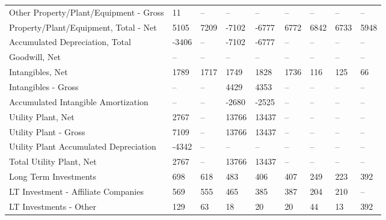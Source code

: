 \documentclass[grad,numbers]{coppe}
\begin{document}
\begin{longtable}[t]{lllllllll}
  \hspace{1em}\hspace{1em}Other Property/Plant/Equipment - Gross & 11 & -- & -- & -- & -- & -- & -- & --\\
  \hspace{1em}Property/Plant/Equipment, Total - Net & 5105 & 7209 & -7102 & -6777 & 6772 & 6842 & 6733 & 5948\\
  \hspace{1em}\hspace{1em}Accumulated Depreciation, Total & -3406 & -- & -7102 & -6777 & -- & -- & -- & --\\
  \hspace{1em}Goodwill, Net & -- & -- & -- & -- & -- & -- & -- & --\\
  \hspace{1em}Intangibles, Net & 1789 & 1717 & 1749 & 1828 & 1736 & 116 & 125 & 66\\
  \hspace{1em}\hspace{1em}Intangibles - Gross & -- & -- & 4429 & 4353 & -- & -- & -- & --\\
  \hspace{1em}\hspace{1em}Accumulated Intangible Amortization & -- & -- & -2680 & -2525 & -- & -- & -- & --\\
  \hspace{1em}Utility Plant, Net & 2767 & -- & 13766 & 13437 & -- & -- & -- & --\\
  \hspace{1em}\hspace{1em}Utility Plant - Gross & 7109 & -- & 13766 & 13437 & -- & -- & -- & --\\
  \hspace{1em}\hspace{1em}Utility Plant Accumulated Depreciation & -4342 & -- & -- & -- & -- & -- & -- & --\\
  \hspace{1em}Total Utility Plant, Net & 2767 & -- & 13766 & 13437 & -- & -- & -- & --\\
  \hspace{1em}Long Term Investments & 698 & 618 & 483 & 406 & 407 & 249 & 223 & 392\\
  \hspace{1em}\hspace{1em}LT Investment - Affiliate Companies & 569 & 555 & 465 & 385 & 387 & 204 & 210 & --\\
  \hspace{1em}\hspace{1em}LT Investments - Other & 129 & 63 & 18 & 20 & 20 & 44 & 13 & 392\\

\end{longtable}
\end{document}
